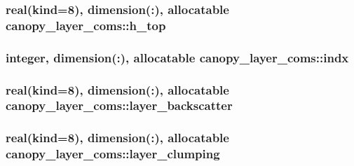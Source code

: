 \subsubsection[{h\+\_\+top}]{\setlength{\rightskip}{0pt plus 5cm}real(kind=8), dimension(\+:), allocatable canopy\+\_\+layer\+\_\+coms\+::h\+\_\+top}\label{namespacecanopy__layer__coms_a16fa644c3a2ec33a530019e5b5caf16c}
\hypertarget{namespacecanopy__layer__coms_a05783dc93acf323347d52ae93a1b5857}{}
\subsubsection[{indx}]{\setlength{\rightskip}{0pt plus 5cm}integer, dimension(\+:), allocatable canopy\+\_\+layer\+\_\+coms\+::indx}\label{namespacecanopy__layer__coms_a05783dc93acf323347d52ae93a1b5857}
\hypertarget{namespacecanopy__layer__coms_a12455d67a7344d67667413f7a371ba7a}{}
\subsubsection[{layer\+\_\+backscatter}]{\setlength{\rightskip}{0pt plus 5cm}real(kind=8), dimension(\+:), allocatable canopy\+\_\+layer\+\_\+coms\+::layer\+\_\+backscatter}\label{namespacecanopy__layer__coms_a12455d67a7344d67667413f7a371ba7a}
\hypertarget{namespacecanopy__layer__coms_a3bb08434b8bb97d6c0b52e6b39189730}{}
\subsubsection[{layer\+\_\+clumping}]{\setlength{\rightskip}{0pt plus 5cm}real(kind=8), dimension(\+:), allocatable canopy\+\_\+layer\+\_\+coms\+::layer\+\_\+clumping}\label{namespacecanopy__layer__coms_a3bb08434b8bb97d6c0b52e6b39189730}
\hypertarget{namespacecanopy__layer__coms_a483cdd99866eb34306b571c8a5929715}{}
